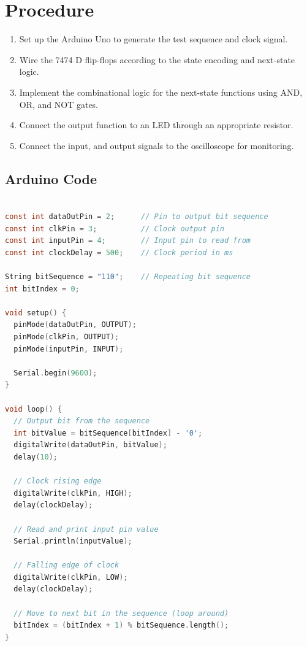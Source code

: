 \documentclass{article}
\begin{document}
\section{Procedure}
\begin{enumerate}
    \item Set up the Arduino Uno to generate the test sequence and clock signal.
    \item Wire the 7474 D flip-flops according to the state encoding and next-state logic.
    \item Implement the combinational logic for the next-state functions using AND, OR, and NOT gates.
    \item Connect the output function to an LED through an appropriate resistor.
    \item Connect the input, and output signals to the oscilloscope for monitoring.
\end{enumerate}

\subsection{Arduino Code}
\begin{lstlisting}[language=C, label=lst:arduino_code, basicstyle=\small\ttfamily, keywordstyle=\color{blue}, commentstyle=\color{green!50!black}, stringstyle=\color{red}]

const int dataOutPin = 2;      // Pin to output bit sequence
const int clkPin = 3;          // Clock output pin
const int inputPin = 4;        // Input pin to read from
const int clockDelay = 500;    // Clock period in ms

String bitSequence = "110";    // Repeating bit sequence
int bitIndex = 0;

void setup() {
  pinMode(dataOutPin, OUTPUT);
  pinMode(clkPin, OUTPUT);
  pinMode(inputPin, INPUT);
  
  Serial.begin(9600);
}

void loop() {
  // Output bit from the sequence
  int bitValue = bitSequence[bitIndex] - '0';
  digitalWrite(dataOutPin, bitValue);
  delay(10);

  // Clock rising edge
  digitalWrite(clkPin, HIGH);
  delay(clockDelay);

  // Read and print input pin value
  Serial.println(inputValue);

  // Falling edge of clock
  digitalWrite(clkPin, LOW);
  delay(clockDelay);

  // Move to next bit in the sequence (loop around)
  bitIndex = (bitIndex + 1) % bitSequence.length();
}
\end{lstlisting}
\end{document}
